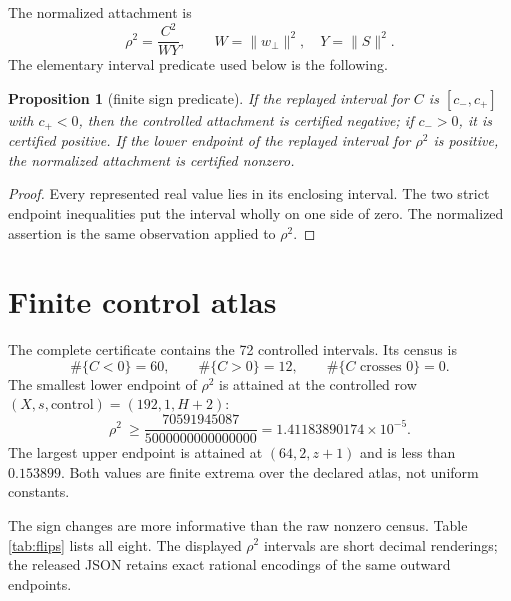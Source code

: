 \documentclass[11pt]{article}
\newtheorem{proposition}[theorem]{Proposition}
\begin{document}
The normalized attachment is
\begin{equation}
 \rho^2=\frac{C^2}{WY},\qquad
 W=\|w_\perp\|^2,\quad Y=\|S\|^2.
 \label{eq:rho}
\end{equation}
The elementary interval predicate used below is the following.

\begin{proposition}[finite sign predicate]
If the replayed interval for $C$ is $[c_-,c_+]$ with $c_+<0$, then the
controlled attachment is certified negative; if $c_->0$, it is certified
positive.  If the lower endpoint of the replayed interval for $\rho^2$ is
positive, the normalized attachment is certified nonzero.
\end{proposition}

\begin{proof}
Every represented real value lies in its enclosing interval.  The two strict
endpoint inequalities put the interval wholly on one side of zero.  The
normalized assertion is the same observation applied to $\rho^2$.
\end{proof}

\section{Finite control atlas}

The complete certificate contains the 72 controlled intervals.  Its census is
\begin{equation}
 \#\{C<0\}=60,\qquad \#\{C>0\}=12,
 \qquad \#\{C\text{ crosses }0\}=0.
 \label{eq:census}
\end{equation}
The smallest lower endpoint of $\rho^2$ is attained at the controlled row
$(X,s,\text{control})=(192,1,H+2)$:
\begin{equation}
 \rho^2\ \geq\frac{70591945087}{5000000000000000}
 =1.41183890174\times10^{-5}.
 \label{eq:weakest}
\end{equation}
The largest upper endpoint is attained at $(64,2,z+1)$ and is less than
$0.153899$.  Both values are finite extrema over the declared atlas, not
uniform constants.

The sign changes are more informative than the raw nonzero census.  Table
\ref{tab:flips} lists all eight.  The displayed $\rho^2$ intervals are
short decimal renderings; the released JSON retains exact rational encodings
of the same outward endpoints.
\end{document}
